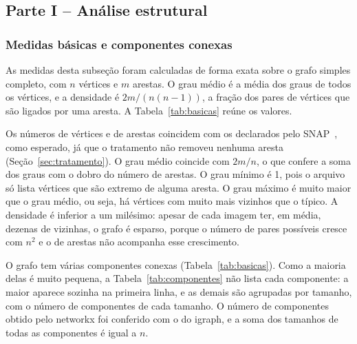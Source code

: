 \subsection{Parte I -- Análise estrutural}
\label{sec:parte1}

\subsubsection{Medidas básicas e componentes conexas}

As medidas desta subseção foram calculadas de forma exata sobre o grafo simples completo, com $n$ vértices e $m$ arestas. O grau médio é a média dos graus de todos os vértices, e a densidade é $2m/(n(n-1))$, a fração dos pares de vértices que são ligados por uma aresta. A Tabela~\ref{tab:basicas} reúne os valores.

\begin{table}[htbp]
  \centering
  \caption{Medidas básicas do grafo simples completo, calculadas de forma exata com o networkx.}
  \label{tab:basicas}
  
\end{table}

Os números de vértices e de arestas coincidem com os declarados pelo SNAP~\cite{snapnets}, como esperado, já que o tratamento não removeu nenhuma aresta (Seção~\ref{sec:tratamento}). O grau médio coincide com $2m/n$, o que confere a soma dos graus com o dobro do número de arestas. O grau mínimo é 1, pois o arquivo só lista vértices que são extremo de alguma aresta. O grau máximo é muito maior que o grau médio, ou seja, há vértices com muito mais vizinhos que o típico. A densidade é inferior a um milésimo: apesar de cada imagem ter, em média, dezenas de vizinhas, o grafo é esparso, porque o número de pares possíveis cresce com $n^2$ e o de arestas não acompanha esse crescimento.

O grafo tem várias componentes conexas (Tabela~\ref{tab:basicas}). Como a maioria delas é muito pequena, a Tabela~\ref{tab:componentes} não lista cada componente: a maior aparece sozinha na primeira linha, e as demais são agrupadas por tamanho, com o número de componentes de cada tamanho. O número de componentes obtido pelo networkx foi conferido com o do igraph, e a soma dos tamanhos de todas as componentes é igual a $n$.

\begin{table}[htbp]
  \centering
  \caption{Componentes conexas do grafo simples completo agrupadas por tamanho (número de vértices): para cada tamanho, o número de componentes que o têm.}
  \label{tab:componentes}
  
\end{table}

